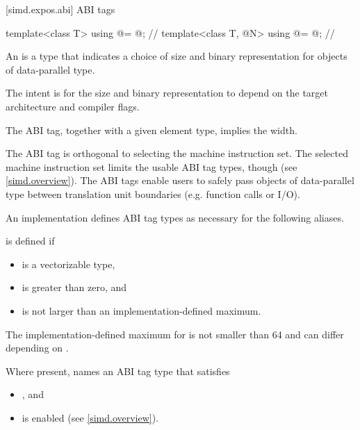 [simd.expos.abi]{ ABI tags}

\begin{itemdecl}
template<class T> using @\nativeabi@ = @\seebelow@; // \expos
template<class T, @\simdsizetype@ N> using @\deducet@ = @\seebelow@; // \expos
\end{itemdecl}

\begin{itemdescr}
\pnum\label{wording.ABI.tag}
An  is a type that indicates a choice of size and binary
representation for objects of data-parallel type.
\begin{note}
  The intent is for the size and binary representation to depend on the target
  architecture and compiler flags.
\end{note}
The ABI tag, together with a given element type, implies the width.

\pnum
\begin{note}
The ABI tag is orthogonal to selecting the machine instruction set.
The selected machine instruction set limits the usable ABI tag types, though
(see \ref{simd.overview}).
The ABI tags enable users to safely pass objects of data-parallel type between
translation unit boundaries (e.g. function calls or I/O).
\end{note}

\pnum
An implementation defines ABI tag types as necessary for the following aliases.

\pnum\label{wording.deducet}
 is defined if
\begin{itemize}
  \item {} is a vectorizable type,
  \item {} is greater than zero, and
  \item {} is not larger than an implementation-defined maximum.
\end{itemize}
The implementation-defined maximum for  is not smaller than 64
and can differ depending on .

\pnum
Where present,  names an ABI tag type that satisfies
\begin{itemize}
  \item {}, and
  \item {} is enabled (see \ref{simd.overview}).
\end{itemize}



\end{itemdescr}
